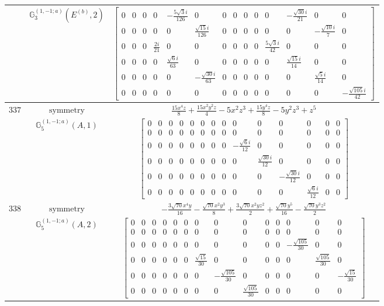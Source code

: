 \documentclass[fleqn,8pt,landscape]{jsarticle}
\begin{document}
\begin{longtable}{ccc}
$  $ & $ \mathbb{G}_{3}^{(1,-1;a)}(E^{(b)},2) $ & $ \begin{bmatrix} 0 & 0 & 0 & 0 & - \frac{5 \sqrt{3} i}{126} & 0 & 0 & 0 & 0 & 0 & 0 & - \frac{\sqrt{30} i}{21} & 0 & 0 \\ 0 & 0 & 0 & 0 & 0 & \frac{\sqrt{15} i}{126} & 0 & 0 & 0 & 0 & 0 & 0 & - \frac{\sqrt{10} i}{7} & 0 \\ 0 & 0 & 0 & \frac{2 i}{21} & 0 & 0 & 0 & 0 & 0 & 0 & \frac{5 \sqrt{3} i}{42} & 0 & 0 & 0 \\ 0 & 0 & 0 & 0 & \frac{\sqrt{6} i}{63} & 0 & 0 & 0 & 0 & 0 & 0 & \frac{\sqrt{15} i}{14} & 0 & 0 \\ 0 & 0 & 0 & 0 & 0 & - \frac{\sqrt{30} i}{63} & 0 & 0 & 0 & 0 & 0 & 0 & \frac{\sqrt{5} i}{14} & 0 \\ 0 & 0 & 0 & 0 & 0 & 0 & 0 & 0 & 0 & 0 & 0 & 0 & 0 & - \frac{\sqrt{105} i}{42} \end{bmatrix} $ \\ \hline
$ 337 $ & $ \text{symmetry} $ & $ \frac{15 x^{4} z}{8} + \frac{15 x^{2} y^{2} z}{4} - 5 x^{2} z^{3} + \frac{15 y^{4} z}{8} - 5 y^{2} z^{3} + z^{5} $ \\
$  $ & $ \mathbb{G}_{5}^{(1,-1;a)}(A,1) $ & $ \begin{bmatrix} 0 & 0 & 0 & 0 & 0 & 0 & 0 & 0 & 0 & 0 & 0 & 0 & 0 & 0 \\ 0 & 0 & 0 & 0 & 0 & 0 & 0 & 0 & 0 & 0 & 0 & 0 & 0 & 0 \\ 0 & 0 & 0 & 0 & 0 & 0 & 0 & 0 & - \frac{\sqrt{6} i}{12} & 0 & 0 & 0 & 0 & 0 \\ 0 & 0 & 0 & 0 & 0 & 0 & 0 & 0 & 0 & \frac{\sqrt{30} i}{12} & 0 & 0 & 0 & 0 \\ 0 & 0 & 0 & 0 & 0 & 0 & 0 & 0 & 0 & 0 & - \frac{\sqrt{30} i}{12} & 0 & 0 & 0 \\ 0 & 0 & 0 & 0 & 0 & 0 & 0 & 0 & 0 & 0 & 0 & \frac{\sqrt{6} i}{12} & 0 & 0 \end{bmatrix} $ \\ \hline
$ 338 $ & $ \text{symmetry} $ & $ - \frac{3 \sqrt{70} x^{4} y}{16} - \frac{\sqrt{70} x^{2} y^{3}}{8} + \frac{3 \sqrt{70} x^{2} y z^{2}}{2} + \frac{\sqrt{70} y^{5}}{16} - \frac{\sqrt{70} y^{3} z^{2}}{2} $ \\
$  $ & $ \mathbb{G}_{5}^{(1,-1;a)}(A,2) $ & $ \begin{bmatrix} 0 & 0 & 0 & 0 & 0 & 0 & 0 & 0 & 0 & 0 & 0 & 0 & 0 & 0 \\ 0 & 0 & 0 & 0 & 0 & 0 & 0 & 0 & 0 & 0 & 0 & 0 & 0 & 0 \\ 0 & 0 & 0 & 0 & 0 & 0 & 0 & 0 & 0 & 0 & 0 & - \frac{\sqrt{105}}{30} & 0 & 0 \\ 0 & 0 & 0 & 0 & 0 & 0 & \frac{\sqrt{15}}{30} & 0 & 0 & 0 & 0 & 0 & \frac{\sqrt{105}}{30} & 0 \\ 0 & 0 & 0 & 0 & 0 & 0 & 0 & - \frac{\sqrt{105}}{30} & 0 & 0 & 0 & 0 & 0 & - \frac{\sqrt{15}}{30} \\ 0 & 0 & 0 & 0 & 0 & 0 & 0 & 0 & \frac{\sqrt{105}}{30} & 0 & 0 & 0 & 0 & 0 \end{bmatrix} $ \\ \hline

\end{longtable}
\end{document}
